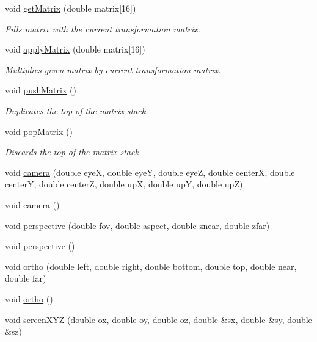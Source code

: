 \begin{DoxyCompactItemize}
void \hyperlink{namespacecprocessing_a239beab716293400201d76c2b161bf94}{get\-Matrix} (double matrix\mbox{[}16\mbox{]})
\begin{DoxyCompactList}\small\item\em \-Fills matrix with the current transformation matrix. \end{DoxyCompactList}\item 
void \hyperlink{namespacecprocessing_ab35dca9be506b14c4b7de3ac852d5761}{apply\-Matrix} (double matrix\mbox{[}16\mbox{]})
\begin{DoxyCompactList}\small\item\em \-Multiplies given matrix by current transformation matrix. \end{DoxyCompactList}\item 
void \hyperlink{namespacecprocessing_a0a8c81bb468438c6fd94d702738c94e7}{push\-Matrix} ()
\begin{DoxyCompactList}\small\item\em \-Duplicates the top of the matrix stack. \end{DoxyCompactList}\item 
void \hyperlink{namespacecprocessing_a447be31257a33fb4bb0e706e97f73637}{pop\-Matrix} ()
\begin{DoxyCompactList}\small\item\em \-Discards the top of the matrix stack. \end{DoxyCompactList}\item 
void \hyperlink{namespacecprocessing_a979315d19d15f5f9bea05e156a3e1ad6}{camera} (double eye\-X, double eye\-Y, double eye\-Z, double center\-X, double center\-Y, double center\-Z, double up\-X, double up\-Y, double up\-Z)
\item 
void \hyperlink{namespacecprocessing_a6c73262dc98cfd96fe88c0ad16a0453c}{camera} ()
\item 
void \hyperlink{namespacecprocessing_af457187b10c596fab7fe6a808a13309b}{perspective} (double fov, double aspect, double znear, double zfar)
\item 
void \hyperlink{namespacecprocessing_a49747e26d8bdc34c207db022abc208ab}{perspective} ()
\item 
void \hyperlink{namespacecprocessing_a565047eb5fbb68d456da93adabf1dcf2}{ortho} (double left, double right, double bottom, double top, double near, double far)
\item 
void \hyperlink{namespacecprocessing_a2f38b0b3a95c2a5a42eff8b20f337606}{ortho} ()
\item 
void \hyperlink{namespacecprocessing_a6240bce03ad9a42c8d943a716cac33be}{screen\-X\-Y\-Z} (double ox, double oy, double oz, double \&sx, double \&sy, double \&sz)

\end{DoxyCompactItemize}
